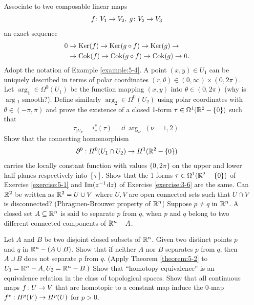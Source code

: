 \begin{enumerate}[\theexercise.1]
  \NewItem Associate to two composable linear maps
    \[
      f\colon {V}_{1} \rightarrow  {V}_{2},\;g\colon {V}_{2} \rightarrow  {V}_{3}
    \]
    an exact sequence
    \[
    \begin{aligned}
      0 & \rightarrow  {\operatorname{Ker}}( f)  \rightarrow  {\operatorname{Ker}}( {g \circ  f})  \rightarrow  {\operatorname{Ker}}( g)  \rightarrow \\
        & \rightarrow  {\operatorname{Cok}}( f)  \rightarrow  {\operatorname{Cok}}( {g \circ  f})  \rightarrow  {\operatorname{Cok}}( g)  \rightarrow  0.
    \end{aligned}
    \]
  \newchap[5]
  \NewItem Adopt the notation of Example \ref{example:5-4}. A point $( {x,y})  \in  {U}_{1}$ can be uniquely described in terms of polar coordinates $( {r,\theta })  \in  ( {0,\infty })  \times  ( {0,{2\pi }})$. Let ${\arg }_{1} \in  {\Omega }^{0}( {U}_{1})$ be the function mapping $(x, y)$ into $\theta  \in  ( {0,{2\pi }})$ (why is $\arg {}_{1}$ smooth?).
    Define similarly ${\arg }_{2} \in  {\Omega }^{0}( {U}_{2})$ using polar coordinates with $\theta  \in  ( {-\pi,\pi })$ and prove the existence of a closed 1-form $\tau  \in  {\Omega }^{1}( {{\mathbb{R}}^{2}-\{ 0\} })$ such that
    \[
      {\tau }_{\mid {U}_{\nu }} = {i}_{\nu }^*( \tau )  = \dd\;{\arg }_{\nu }\;( {\nu  = 1,2}).
    \]
    Show that the connecting homomorphism
    \[
      {\partial }^{0} : {H}^{0}( {{U}_{1} \cap  {U}_{2}})  \rightarrow  {H}^{1}( {{\mathbb{R}}^{2}-\{ 0\} })
    \]
    carries the locally constant function with values $\{ 0,{2\pi }\}$ on the upper and lower half-planes respectively into $[  \tau ]$.
  \NewItem Show that the 1-forms $\tau  \in  {\Omega }^{1}( {{\mathbb{R}}^{2}-\{ 0\} })$ of Exercise \ref{exercise:5-1} and $\im( {{z}^{-1}{\dd z}})$ of Exercise \ref{exercise:3-6} are the same.
  \NewItem Can ${\mathbb{R}}^{2}$ be written as ${\mathbb{R}}^{2} = U \cup  V$ where $U,V$ are open connected sets such that $U \cap  V$ is disconnected?
  \NewItem (Phragmen-Brouwer property of ${\mathbb{R}}^{n}$) Suppose $p \neq  q$ in ${\mathbb{R}}^{n}$. A closed set $A \subseteq  {\ensuremath{\mathbb{R}}}^{n}$ is said to separate $p$ from $q$, when $p$ and $q$ belong to two different connected components of ${{\mathbb{R}}}^{n}- A$.\par
    Let $A$ and $B$ be two disjoint closed subsets of ${\mathbb{R}}^{n}$. Given two distinct points $p$ and $q$ in ${\mathbb{R}}^{n}- ( {A \cup  B})$. Show that if neither $A$ nor $B$ separates $p$ from $q$, then $A \cup  B$ does not separate $p$ from $q$. (Apply Theorem \ref{theorem:5-2} to ${U}_{1} = {\mathbb{R}}^{n}- A,{U}_{2} = {\mathbb{R}}^{n}- B.)$
  \newchap[6]
  \NewItem Show that ``homotopy equivalence'' is an equivalence relation in the class of topological spaces.
  \NewItem Show that all continuous maps $f\colon U \rightarrow  V$ that are homotopic to a constant map induce the 0-map $f^*: {H}^{p}( V)  \rightarrow  {H}^{p}( U)$ for $p > 0$.

\end{enumerate}

